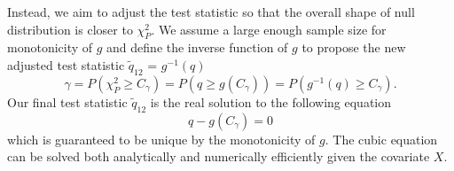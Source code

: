 \documentclass[aap,authoryear, preprint]{imsart}
\numberwithin{equation}{section}
\theoremstyle{plain}
\begin{document}
\vspace{5mm} 
Instead, we aim to adjust the test statistic so that the overall shape of null distribution is closer to $\chi_{P}^2$. We assume a large enough sample size for monotonicity of $g$ and define the inverse function of $g$ to propose the new adjusted test statistic $\tilde{q}_{12}$ = $g^{-1}(q)$
$$\gamma = P(\chi_{P}^2 \geq C_{\gamma}) = P(q \geq g(C_{\gamma})) = P(g^{-1}(q) \geq C_{\gamma}).$$
Our final test statistic $\tilde{q}_{12}$ is the real solution to the following equation 
$$q - g(C_{\gamma}) = 0$$
which is guaranteed to be unique by the monotonicity of $g$. The cubic equation can be solved both analytically and numerically efficiently given the covariate $X$. 
\end{document}
